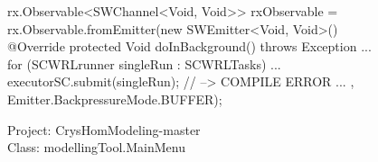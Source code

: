 \begin{figure}[H]
\begin{sourcecode}
\begin{javacode}{7}
rx.Observable<SWChannel<Void, Void>> rxObservable = rx.Observable.fromEmitter(new SWEmitter<Void, Void>(){
	@Override
	protected Void doInBackground() throws Exception {
		...
					for (SCWRLrunner singleRun : SCWRLTasks) {
						...
						executorSC.submit(singleRun); // --> COMPILE ERROR
					}
		...
	}
}, Emitter.BackpressureMode.BUFFER);
\end{javacode}
\caption{Project: CrysHomModeling-master\\ Class: modellingTool.MainMenu}
\label{code:nested-swingworkers}
\end{sourcecode}
\end{figure}
